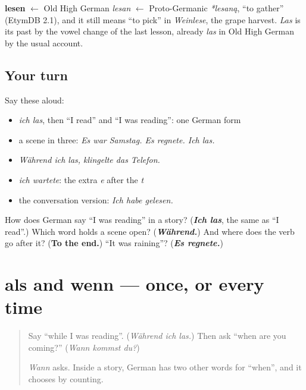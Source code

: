 \begin{cousinweb}
\textbf{lesen} $\leftarrow$ Old High German \emph{lesan} $\leftarrow$ Proto-Germanic \emph{*lesaną}, \textquotedblleft{}to gather\textquotedblright{} (EtymDB 2.1), and it still means \textquotedblleft{}to pick\textquotedblright{} in \emph{Weinlese}, the grape harvest. \emph{Las} is its past by the vowel change of the last lesson, already \emph{las} in Old High German by the usual account.
\end{cousinweb}

\subsection*{Your turn}
Say these aloud:

\begin{itemize}
\raggedright
  \item \emph{ich las}, then \textquotedblleft{}I read\textquotedblright{} and \textquotedblleft{}I was reading\textquotedblright{}: one German form
  \item a scene in three: \emph{Es war Samstag. Es regnete. Ich las.}
  \item \emph{Während ich las, klingelte das Telefon.}
  \item \emph{ich wartete}: the extra \emph{e} after the \emph{t}
  \item the conversation version: \emph{Ich habe gelesen.}
\end{itemize}

\begin{tcolorbox}[breakable,colback=teal!4,colframe=teal!35!black,title={Before you move on}]
How does German say \textquotedblleft{}I was reading\textquotedblright{} in a story? (\emph{\textbf{Ich las}}, the same as \textquotedblleft{}I read\textquotedblright{}.) Which word holds a scene open? (\emph{\textbf{Während.}}) And where does the verb go after it? (\textbf{To the end.}) \textquotedblleft{}It was raining\textquotedblright{}? (\emph{\textbf{Es regnete.}})
\end{tcolorbox}
\section[als, wenn]{als and wenn — once, or every time}

\label{lesson:GE-C252-als}



\begin{quote}
Say \textquotedblleft{}while I was reading\textquotedblright{}. (\emph{Während ich las.}) Then ask \textquotedblleft{}when are you coming?\textquotedblright{} (\emph{Wann kommst du?})

\emph{Wann} asks. Inside a story, German has two other words for \textquotedblleft{}when\textquotedblright{}, and it chooses by counting.
\end{quote}

